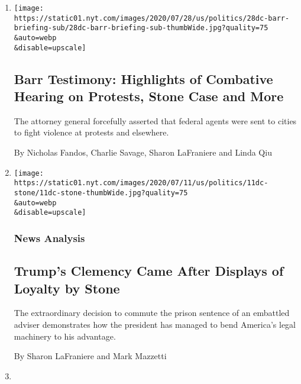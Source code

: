 \begin{enumerate}
\def\labelenumi{\arabic{enumi}.}
\item
  \href{/2020/07/28/us/politics/william-barr-house-judiciary-hearing.html}{}

  \texttt{[image: https://static01.nyt.com/images/2020/07/28/us/politics/28dc-barr-briefing-sub/28dc-barr-briefing-sub-thumbWide.jpg?quality=75\\\&auto=webp\\\&disable=upscale]}

  \hypertarget{barr-testimony-highlights-of-combative-hearing-on-protests-stone-case-and-more}{%
  \subsection{Barr Testimony: Highlights of Combative Hearing on
  Protests, Stone Case and
  More}\label{barr-testimony-highlights-of-combative-hearing-on-protests-stone-case-and-more}}

  The attorney general forcefully asserted that federal agents were sent
  to cities to fight violence at protests and elsewhere.

  By Nicholas Fandos, Charlie Savage, Sharon LaFraniere and Linda Qiu
\item
  \href{/2020/07/11/us/politics/trump-roger-stone.html}{}

  \texttt{[image: https://static01.nyt.com/images/2020/07/11/us/politics/11dc-stone/11dc-stone-thumbWide.jpg?quality=75\\\&auto=webp\\\&disable=upscale]}

  \hypertarget{news-analysis}{%
  \subsubsection{News Analysis}\label{news-analysis}}

  \hypertarget{trumps-clemency-came-after-displays-of-loyalty-by-stone}{%
  \subsection{Trump's Clemency Came After Displays of Loyalty by
  Stone}\label{trumps-clemency-came-after-displays-of-loyalty-by-stone}}

  The extraordinary decision to commute the prison sentence of an
  embattled adviser demonstrates how the president has managed to bend
  America's legal machinery to his advantage.

  By Sharon LaFraniere and Mark Mazzetti
\item
  \href{/2020/07/10/us/politics/trump-roger-stone-clemency.html}{}


\end{enumerate}
